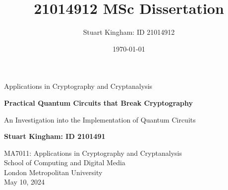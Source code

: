 \documentclass[11pt,a4paper]{article}
\author{Stuart Kingham: ID 21014912}
\title{21014912 MSc Dissertation}
\date{\today}
\begin{document}
\doublespacing

\begin{titlepage}
  \vspace*{\fill}
  \begin{center}
       \vspace*{1cm}

       {\LARGE Applications in Cryptography and Cryptanalysis}

       \vspace*{1cm}
       {\large \textbf{Practical Quantum Circuits that Break Cryptography}}
       
       \vspace{0.2cm}
       {\large An Investigation into the Implementation of Quantum Circuits}
            

       \vfill

       \textbf{Stuart Kingham: ID 2101491}

       \vfill
                        
       \vspace{0.8cm}
     

       MA7011: Applications in Cryptography and Cryptanalysis \\
       School of Computing and Digital Media\\
       London Metropolitan University\\
       May 10, 2024
            
  \end{center}
  \vspace*{\fill}
\end{titlepage}

\pagebreak



\newpage

\singlespacing 
\tableofcontents
\listoffigures

\doublespacing
{}

\newpage



\pagebreak

\printbibliography

\pagebreak

\appendix



\pagebreak

\printindex
\end{document}
